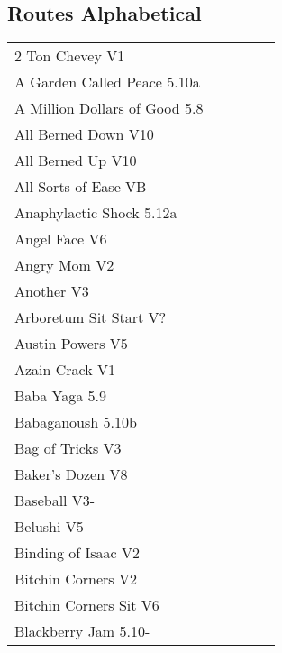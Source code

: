 \twocolumn
{}
\begin{flushleft}

\needspace{1.5cm}
\section{Routes Alphabetical}
\begin{center}
\begin{supertabular}{p{0.76\linewidth}p{0.08\linewidth}}
2 Ton Chevey V1 & \pageref{rt:2 Ton Chevey} \\
A Garden Called Peace 5.10a & \pageref{rt:A Garden Called Peace} \\
A Million Dollars of Good 5.8 & \pageref{rt:A Million Dollars of Good} \\
All Berned Down V10 & \pageref{rt:All Berned Down} \\
All Berned Up V10 & \pageref{rt:All Berned Up} \\
All Sorts of Ease VB & \pageref{rt:All Sorts of Ease} \\
Anaphylactic Shock 5.12a & \pageref{rt:Anaphylactic Shock} \\
Angel Face V6 & \pageref{rt:Angel Face} \\
Angry Mom V2 & \pageref{rt:Angry Mom} \\
Another V3 & \pageref{rt:Another} \\
Arboretum Sit Start V? & \pageref{vr:Arboretum Sit Start} \\
Austin Powers V5 & \pageref{rt:Austin Powers} \\
Azain Crack V1 & \pageref{vr:Azain Crack} \\
Baba Yaga 5.9 & \pageref{rt:Baba Yaga} \\
Babaganoush 5.10b & \pageref{rt:Babaganoush} \\
Bag of Tricks V3 & \pageref{vr:Bag of Tricks} \\
Baker's Dozen V8 & \pageref{vr:Baker's Dozen} \\
Baseball V3- & \pageref{rt:Baseball} \\
Belushi V5 & \pageref{rt:Belushi} \\
Binding of Isaac V2 & \pageref{rt:Binding of Isaac} \\
Bitchin Corners V2 & \pageref{rt:Bitchin Corners} \\
Bitchin Corners Sit V6 & \pageref{vr:Bitchin Corners Sit} \\
Blackberry Jam 5.10- & \pageref{rt:Blackberry Jam} \\

\end{supertabular}
\end{center}
\end{flushleft}
